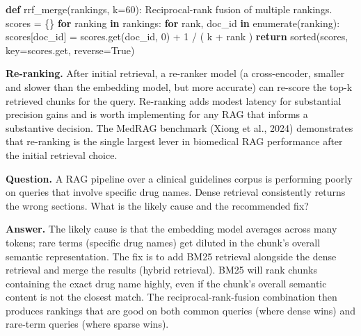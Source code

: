 \documentclass[
  letterpaper,
  11pt]{scrbook}
\newenvironment{Shaded}{\begin{snugshade}}{\end{snugshade}}
\newcommand{\BuiltInTok}[1]{\textcolor[rgb]{0.00,0.23,0.31}{#1}}
\newcommand{\CommentTok}[1]{\textcolor[rgb]{0.37,0.37,0.37}{#1}}
\newcommand{\ControlFlowTok}[1]{\textcolor[rgb]{0.00,0.23,0.31}{\textbf{#1}}}
\newcommand{\DecValTok}[1]{\textcolor[rgb]{0.68,0.00,0.00}{#1}}
\newcommand{\KeywordTok}[1]{\textcolor[rgb]{0.00,0.23,0.31}{\textbf{#1}}}
\newcommand{\NormalTok}[1]{\textcolor[rgb]{0.00,0.23,0.31}{#1}}
\newcommand{\OperatorTok}[1]{\textcolor[rgb]{0.37,0.37,0.37}{#1}}
\newcommand{\VariableTok}[1]{\textcolor[rgb]{0.07,0.07,0.07}{#1}}
\begin{document}
\begin{Shaded}
\begin{Highlighting}[]
\KeywordTok{def}\NormalTok{ rrf\_merge(rankings, k}\OperatorTok{=}\DecValTok{60}\NormalTok{):}
    \CommentTok{\textquotesingle{}\textquotesingle{}\textquotesingle{}Reciprocal{-}rank fusion of multiple rankings.\textquotesingle{}\textquotesingle{}\textquotesingle{}}
\NormalTok{    scores }\OperatorTok{=}\NormalTok{ \{\}}
    \ControlFlowTok{for}\NormalTok{ ranking }\KeywordTok{in}\NormalTok{ rankings:}
        \ControlFlowTok{for}\NormalTok{ rank, doc\_id }\KeywordTok{in} \BuiltInTok{enumerate}\NormalTok{(ranking):}
\NormalTok{            scores[doc\_id] }\OperatorTok{=}\NormalTok{ scores.get(doc\_id, }\DecValTok{0}\NormalTok{) }\OperatorTok{+} \DecValTok{1} \OperatorTok{/}\NormalTok{ (}
\NormalTok{                k }\OperatorTok{+}\NormalTok{ rank}
\NormalTok{            )}
    \ControlFlowTok{return} \BuiltInTok{sorted}\NormalTok{(scores, key}\OperatorTok{=}\NormalTok{scores.get, reverse}\OperatorTok{=}\VariableTok{True}\NormalTok{)}
\end{Highlighting}
\end{Shaded}

\textbf{Re-ranking.} After initial retrieval, a re-ranker model (a
cross-encoder, smaller and slower than the embedding model, but more
accurate) can re-score the top-k retrieved chunks for the query.
Re-ranking adds modest latency for substantial precision gains and is
worth implementing for any RAG that informs a substantive decision. The
MedRAG benchmark (Xiong et al., 2024) demonstrates that re-ranking is
the single largest lever in biomedical RAG performance after the initial
retrieval choice.

\begin{tcolorbox}[enhanced jigsaw, arc=.35mm, bottomrule=.15mm, bottomtitle=1mm, breakable, colback=white, colbacktitle=quarto-callout-note-color!10!white, colframe=quarto-callout-note-color-frame, coltitle=black, left=2mm, leftrule=.75mm, opacityback=0, opacitybacktitle=0.6, rightrule=.15mm, title={Check your understanding: when sparse beats dense}, titlerule=0mm, toprule=.15mm, toptitle=1mm]

\textbf{Question.} A RAG pipeline over a clinical guidelines corpus is
performing poorly on queries that involve specific drug names. Dense
retrieval consistently returns the wrong sections. What is the likely
cause and the recommended fix?

\textbf{Answer.} The likely cause is that the embedding model averages
across many tokens; rare terms (specific drug names) get diluted in the
chunk's overall semantic representation. The fix is to add BM25
retrieval alongside the dense retrieval and merge the results (hybrid
retrieval). BM25 will rank chunks containing the exact drug name highly,
even if the chunk's overall semantic content is not the closest match.
The reciprocal-rank-fusion combination then produces rankings that are
good on both common queries (where dense wins) and rare-term queries
(where sparse wins).

\end{tcolorbox}
\end{document}
